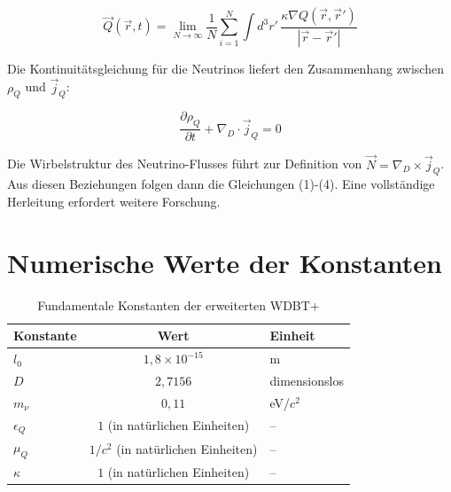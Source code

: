 \documentclass[12pt,a4paper]{article}
\begin{document}
\[
\vec{Q}(\vec{r}, t) = \lim_{N \to \infty} \frac{1}{N} \sum_{i=1}^N \int d^3r' \, \frac{\kappa \nabla Q(\vec{r}, \vec{r}')}{|\vec{r} - \vec{r}'|}
\]

Die Kontinuitätsgleichung für die Neutrinos liefert den Zusammenhang zwischen \(\rho_Q\) und \(\vec{j}_Q\):

\[
\frac{\partial \rho_Q}{\partial t} + \nabla_D \cdot \vec{j}_Q = 0
\]

Die Wirbelstruktur des Neutrino-Flusses führt zur Definition von \(\vec{N} = \nabla_D \times \vec{j}_Q\). Aus diesen Beziehungen folgen dann die Gleichungen (1)-(4). Eine vollständige Herleitung erfordert weitere Forschung.

\section{Numerische Werte der Konstanten}

\begin{table}[H]
\centering
\begin{tabular}{lcl}
\toprule
Konstante & Wert & Einheit \\
\midrule
\(l_0\) & \(1,8 \times 10^{-15}\) & m \\
\(D\) & \(2,7156\) & dimensionslos \\
\(m_\nu\) & \(0,11\) & eV/\(c^2\) \\
\(\epsilon_Q\) & \(1\) (in natürlichen Einheiten) & – \\
\(\mu_Q\) & \(1/c^2\) (in natürlichen Einheiten) & – \\
\(\kappa\) & \(1\) (in natürlichen Einheiten) & – \\
\bottomrule
\end{tabular}
\caption{Fundamentale Konstanten der erweiterten WDBT+}
\end{table}
\end{document}
